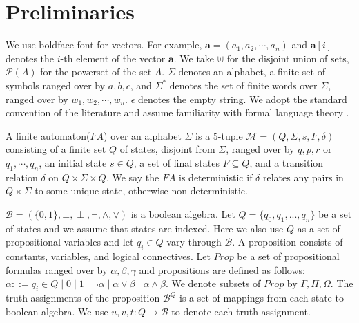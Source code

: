 \section{Preliminaries}

We use boldface font for vectors. For example, \( \mathbf{a} = (a_1, a_2,
\cdots, a_n) \) and \( \mathbf{a}[i] \) denotes the \( i \)-th element of the
vector \( \mathbf{a} \). We take \( \uplus \) for the disjoint union of sets, \(
\mathcal{P}(A) \) for the powerset of the set \( A \). \( \Sigma \) denotes an
alphabet, a finite set of symbols ranged over by \( a, b, c \), and \( \Sigma^*
\) denotes the set of finite words over \( \Sigma \), ranged over by \( w_1,
w_2, \cdots, w_n \). \( \epsilon \) denotes the empty string. We adopt the
standard convention of the literature \cite{Thomas:1997,tata2007} and assume
familiarity with formal language theory \cite{Kozen:1997}.

A finite automaton(\( \mathit{FA} \)) over an alphabet \( \Sigma \) is a 5-tuple
\( \mathcal{M} = (Q, \Sigma, s, F, \delta) \) consisting of a finite set \( Q \)
of states, disjoint from \( \Sigma \), ranged over by \( q, p, r \) or \( q_1,
\cdots , q_n \), an initial state \( s \in Q \), a set of final states \( F
\subseteq Q \), and a transition relation \( \delta \) on \( Q \times \Sigma
\times Q \). We say the \(\mathit{FA}\) is deterministic if \( \delta \) relates
any pairs in \( Q \times \Sigma \) to some unique state, otherwise
non-deterministic.

\( \mathcal{B} = (\{0, 1\}, \bot, \perp, \neg, \wedge, \vee) \) is a boolean
algebra. Let \( Q = \{ q_0, q_1, ..., q_n \} \) be a set of states and we assume
that states are indexed. Here we also use \( Q \) as a set of propositional
variables and let \( q_i \in Q \) vary through \( \mathcal{B} \). A proposition
consists of constants, variables, and logical connectives. Let \( \mathit{Prop}
\) be a set of propositional formulas ranged over by \( \alpha, \beta, \gamma \)
and propositions are defined as follows: \(\alpha ::= q_i \in Q \mid 0 \mid 1
\mid \neg \alpha \mid \alpha \vee \beta \mid \alpha \wedge \beta\). We denote
subsets of \( \mathit{Prop} \) by \( \Gamma, \Pi, \Omega \). The truth
assignments of the proposition \(\mathcal{B}^Q\) is a set of mappings from each
state to boolean algebra. We use \( u, v, t : Q \rightarrow \mathcal{B} \) to
denote each truth assignment.

